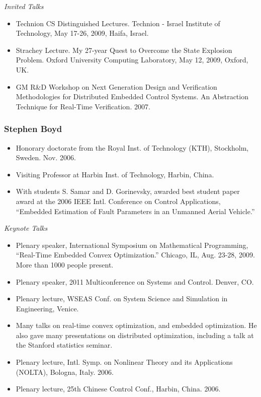                 \emph{Invited Talks}

                \begin{itemize}

                    \item Technion CS Distinguished Lectures. Technion - Israel Institute of Technology, May 17-26, 2009, Haifa, Israel.
                    \item Strachey Lecture. My 27-year Quest to Overcome the State Explosion Problem. Oxford University Computing Laboratory, May 12, 2009, Oxford, UK.

                    \item GM R\&D Workshop on Next Generation Design and Verification Methodologies for Distributed Embedded Control Systems. An Abstraction Technique for Real-Time Verification.  2007.

                \end{itemize}

\subsubsection{Stephen Boyd}

\begin{itemize}
\item Honorary doctorate from the Royal Inst. of Technology (KTH), Stockholm, Sweden. Nov. 2006.
\item Visiting Professor at Harbin Inst. of Technology, Harbin, China.
\item With students S. Samar and D. Gorinevsky, awarded best student paper award at the 2006 IEEE Intl. Conference on Control Applications, ``Embedded Estimation of Fault Parameters in an Unmanned Aerial Vehicle.''
\end{itemize}

\emph{Keynote Talks}

\begin{itemize}
\item Plenary speaker, International Symposium on Mathematical Programming, ``Real-Time Embedded Convex Optimization.'' Chicago, IL, Aug. 23-28, 2009.  More than 1000 people present.
\item Plenary speaker, 2011 Multiconference on Systems and Control.  Denver, CO.
\item Plenary lecture, WSEAS Conf. on System Science and Simulation in Engineering, Venice.
\item Many talks on real-time convex optimization, and embedded optimization.  He also gave many presentations on distributed optimization, including a talk at the Stanford statistics seminar.
\item Plenary lecture, Intl. Symp. on Nonlinear Theory and its Applications (NOLTA), Bologna, Italy. 2006.
\item Plenary lecture, 25th Chinese Control Conf., Harbin, China. 2006.
\end{itemize}

